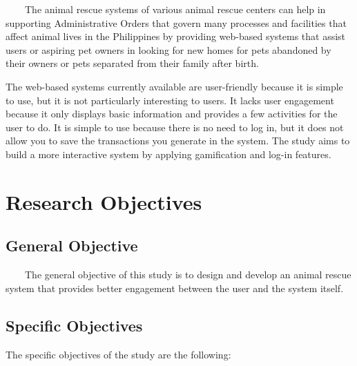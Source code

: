 ~~~~The animal rescue systems of various animal rescue centers can help in supporting Administrative Orders that govern many processes and facilities that affect animal lives in the Philippines by providing web-based systems that assist users or aspiring pet owners in looking for new homes for pets abandoned by their owners or pets separated from their family after birth.

The web-based systems currently available are user-friendly because it is simple to use, but it is not particularly interesting to users. It lacks user engagement because it only displays basic information and provides a few activities for the user to do. It is simple to use because there is no need to log in, but it does not allow you to save the transactions you generate in the system. The study aims to build a more interactive system by applying gamification and log-in features. 



\section{Research Objectives}
\label{sec:researchobjectives}

\subsection{General Objective}
\label{sec:generalobjective}

~~~~The general objective of this study is to design and develop an animal rescue system that provides better engagement between the user and the system itself.

\subsection{Specific Objectives}
\label{sec:specificobjectives}

%
%
The specific objectives of the study are the following:

